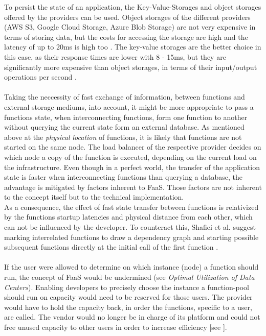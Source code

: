 \documentclass[11pt]{article}
\begin{document}
To persist the state of an application, the Key-Value-Storages and object storages offered by the providers can be used. Object storages of the different providers (AWS S3, Google Cloud Storage, Azure Blob Storage) are not very expensive in terms of storing data, but the costs for accessing the storage are high and the latency of up to 20ms is high too \cite{jonas2019cloud}. The key-value storages are the better choice in this case, as their response times are lower with 8 - 15ms, but they are significantly more expensive than object storages, in terms of their input/output operations per second \cite{jonas2019cloud}.\\\\ 
Taking the neccessity of fast exchange of information, between functions and external storage mediums, into account, it might be more appropriate to pass a functions state, when interconnecting functions, form one function to another without querying the current state form an external database. As mentioned above at the \textit{physical location} of functions, it is likely that functions are not started on the same node. The load balancer of the respective provider decides on which node a copy of the function is executed, depending on the current load on the infrastructure. Even though in a perfect world, the transfer of the application state is faster when interconnecting functions than querying a database, the advantage is mitigated by factors inherent to FaaS. Those factors are not inherent to the concept itself but to the technical implementation.\\ As a consequence, the effect of fast state transfer between functions is relativized by the functions startup latencies and physical distance from each other, which can not be influenced by the developer. To counteract this, Shaﬁei et al. suggest marking interrelated functions to draw a dependency graph and starting possible subsequent functions directly at the initial call of the first function \cite{shafiei2020serverless}.\\\\
If the user were allowed to determine on which instance (node) a function should run, the concept of FaaS would be undermined (see \textit{Optimal Utilization of Data Centers}). Enabling developers to precisely choose the instance a function-pool should run on capacity would need to be reserved for those users. The provider would have to hold the capacity back, in order the functions, specific to a user, are called. The vendor would no longer be in charge of its platform and could not free unused capacity to other users in order to increase efficiency [see \cite{fowler2018serverless}]. 
\end{document}

